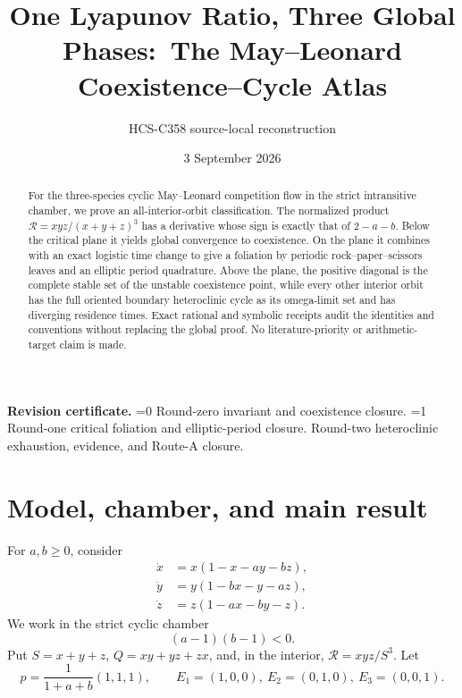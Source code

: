 \documentclass[10pt]{article}
\title{One Lyapunov Ratio, Three Global Phases:\
The May--Leonard Coexistence--Cycle Atlas}
\author{HCS-C358 source-local reconstruction}
\date{3 September 2026}
\providecommand{\CRevisionRound}{2}
\theoremstyle{remark}
\newcommand{\R}{\mathcal R}
\begin{document}
\maketitle

\begin{abstract}
For the three-species cyclic May--Leonard competition flow in the strict
intransitive chamber, we prove an all-interior-orbit classification.  The
normalized product $\R=xyz/(x+y+z)^3$ has a derivative whose sign is exactly
that of $2-a-b$.  Below the critical plane it yields global convergence to
coexistence.  On the plane it combines with an exact logistic time change to
give a foliation by periodic rock--paper--scissors leaves and an elliptic
period quadrature.  Above the plane, the positive diagonal is the complete
stable set of the unstable coexistence point, while every other interior
orbit has the full oriented boundary heteroclinic cycle as its omega-limit
set and has diverging residence times.  Exact rational and symbolic receipts
audit the identities and conventions without replacing the global proof.  No
literature-priority or arithmetic-target claim is made.
\end{abstract}

\noindent\textbf{Revision certificate.}
\ifnum\CRevisionRound=0
Round-zero invariant and coexistence closure.
\else\ifnum\CRevisionRound=1
Round-one critical foliation and elliptic-period closure.
\else
Round-two heteroclinic exhaustion, evidence, and Route-A closure.
\fi\fi

\small
\section{Model, chamber, and main result}

For $a,b\geq0$, consider
\begin{equation}
\begin{aligned}
 \dot x&=x(1-x-ay-bz),\\
 \dot y&=y(1-bx-y-az),\\
 \dot z&=z(1-ax-by-z).
\end{aligned}
\end{equation}
We work in the strict cyclic chamber
\begin{equation}
                 (a-1)(b-1)<0.
\end{equation}
Put $S=x+y+z$, $Q=xy+yz+zx$, and, in the interior,
$\R=xyz/S^3$.  Let
\[
 p=\frac{1}{1+a+b}(1,1,1),\qquad
 E_1=(1,0,0),\ E_2=(0,1,0),\ E_3=(0,0,1).
\]
\end{document}
